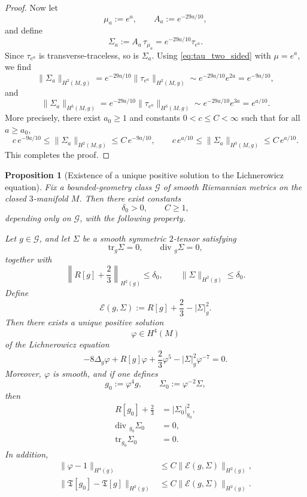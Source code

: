 \documentclass{amsart}
\newtheorem{proposition}{Proposition}[section]
\renewcommand{\div}{\mbox{div }}
\newcommand{\tr}{\mbox{tr}}
\begin{document}
\begin{proof}
\noindent Now let
\[
\mu_{a}:=e^{a},
\qquad
A_{a}:=e^{-29a/10},
\]
and define
\[
\Sigma_{a}:=A_{a}\,\tau_{\mu_{a}}
=
e^{-29a/10}\tau_{e^{a}}.
\]
Since $\tau_{e^{a}}$ is transverse-traceless, so is $\Sigma_{a}$. Using \eqref{eq:tau_two_sided} with $\mu=e^{a}$, we find
\[
\|\Sigma_{a}\|_{H^{2}(M,g)}
=
e^{-29a/10}\|\tau_{e^{a}}\|_{H^{2}(M,g)}
\sim
e^{-29a/10}e^{2a}
=
e^{-9a/10},
\]
and
\[
\|\Sigma_{a}\|_{H^{3}(M,g)}
=
e^{-29a/10}\|\tau_{e^{a}}\|_{H^{3}(M,g)}
\sim
e^{-29a/10}e^{3a}
=
e^{a/10}.
\]
More precisely, there exist $a_{0}\geq 1$ and constants $0<c\leq C<\infty$ such that for all $a\geq a_{0}$,
\[
c\,e^{-9a/10}\leq \|\Sigma_{a}\|_{H^{2}(M,g)}\leq C\,e^{-9a/10},
\qquad
c\,e^{a/10}\leq \|\Sigma_{a}\|_{H^{3}(M,g)}\leq C\,e^{a/10}.
\]
This completes the proof.
\end{proof}




\begin{proposition}[Existence of a unique positive solution to the Lichnerowicz equation]
\label{prop:conformal-correction}
Fix a bounded-geometry class \(\mathcal G\) of smooth Riemannian metrics on the closed
\(3\)-manifold \(M\). Then there exist constants
\[
\delta_{0}>0,\qquad C\ge 1,
\]
depending only on \(\mathcal G\), with the following property.

\noindent Let \(g\in \mathcal G\), and let \(\Sigma\) be a smooth symmetric \(2\)-tensor satisfying
\[
\tr_{g}\Sigma=0,\qquad \div_{g}\Sigma=0,
\]
together with
\[
\left\|R[g]+\frac23\right\|_{H^{2}(g)}\le \delta_{0},
\qquad
\|\Sigma\|_{H^{2}(g)}\le \delta_{0}.
\]
Define
\[
\mathcal E(g,\Sigma):=R[g]+\frac23-|\Sigma|_{g}^{2}.
\]
Then there exists a unique positive solution
\[
\varphi\in H^{4}(M)
\]
of the Lichnerowicz equation
\begin{equation}
\label{eq:Lichnerowicz-exact-corrected}
-8\Delta_{g}\varphi + R[g]\varphi + \frac23 \varphi^{5} - |\Sigma|_{g}^{2}\varphi^{-7}=0.
\end{equation}
Moreover, \(\varphi\) is smooth, and if one defines
\[
g_{0}:=\varphi^{4}g,\qquad \Sigma_{0}:=\varphi^{-2}\Sigma,
\]
then
\begin{align}
R[g_{0}]+\frac23&=|\Sigma_{0}|_{g_{0}}^{2},\\
\div_{g_{0}}\Sigma_{0}&=0,\\
\tr_{g_{0}}\Sigma_{0}&=0.
\end{align}
In addition,
\begin{align}
\label{eq:phi-close-corrected}
\|\varphi-1\|_{H^{4}(g)}
&\leq
C\|\mathcal E(g,\Sigma)\|_{H^{2}(g)},\\
\label{eq:T-change-corrected}
\|\mathfrak T[g_{0}]-\mathfrak T[g]\|_{H^{2}(g)}
&\leq
C\|\mathcal E(g,\Sigma)\|_{H^{2}(g)}.
\end{align}
\end{proposition}
\end{document}
